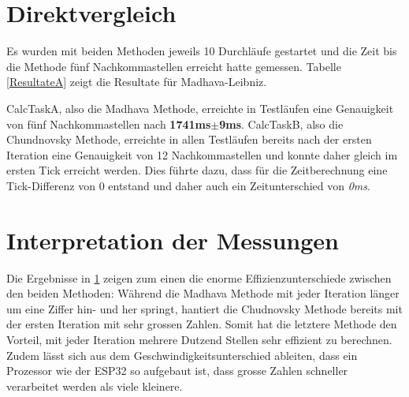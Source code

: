 \documentclass[ngerman,10pt,a4paper,titlepage]{report}
\begin{document}
	\section{Direktvergleich}\label{comparison}
	Es wurden mit beiden Methoden jeweils 10 Durchläufe gestartet und die Zeit bis die Methode fünf Nachkommastellen erreicht hatte gemessen. Tabelle \ref{ResultateA} zeigt die Resultate für Madhava-Leibniz.
	\begin{table}[h]
		\doublespacing
	\caption{Die Messresultate zeigen deutliche Unterschiede zwischen den Methoden.}
	\end{table}
	CalcTaskA, also die Madhava Methode, erreichte in Testläufen eine Genauigkeit von fünf Nachkommastellen nach \textbf{1741ms$\pm$9ms}.
	CalcTaskB, also die Chundnovsky Methode, erreichte in allen Testläufen bereits nach der ersten Iteration eine Genauigkeit von 12 Nachkommastellen und konnte daher gleich im ersten Tick erreicht werden. Dies führte dazu, dass für die Zeitberechnung eine Tick-Differenz von 0 entstand und daher auch ein Zeitunterschied von \textit{\textacutedbl0ms\textacutedbl}.
	\section{Interpretation der Messungen}
	Die Ergebnisse in \ref{comparison} zeigen zum einen die enorme Effizienzunterschiede zwischen den beiden Methoden: Während die Madhava Methode mit jeder Iteration länger um eine Ziffer hin- und her springt, hantiert die Chudnovsky Methode bereits mit der ersten Iteration mit sehr grossen Zahlen. Somit hat die letztere Methode den Vorteil, mit jeder Iteration mehrere Dutzend Stellen sehr effizient zu berechnen.\\Zudem lässt sich aus dem Geschwindigkeitsunterschied ableiten, dass ein Prozessor wie der ESP32 so aufgebaut ist, dass grosse Zahlen schneller verarbeitet werden als viele kleinere.
	
\end{document}
